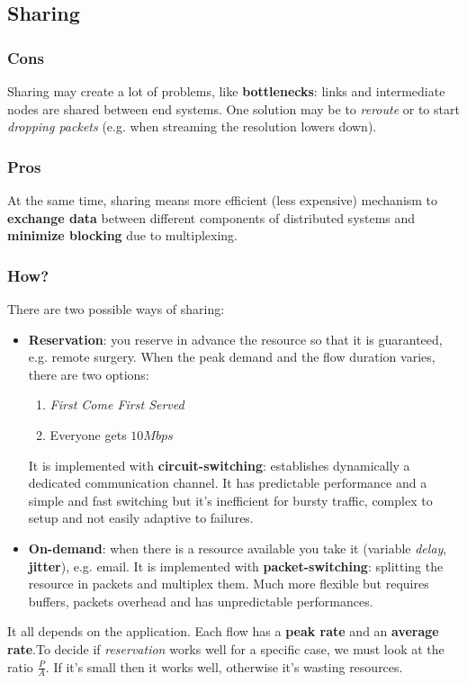\subsection{Sharing}
\subsubsection{Cons}
Sharing may create a lot of problems, like \textbf{bottlenecks}: links and intermediate nodes are shared between end systems. One solution may be to \textit{reroute} or to start \textit{dropping packets} (e.g. when streaming the resolution lowers down).
\subsubsection{Pros}
At the same time, sharing means more efficient (less expensive) mechanism to \textbf{exchange data} between different components of distributed systems and \textbf{minimize blocking} due to multiplexing.

\subsubsection{How?}
There are two possible ways of sharing:
\begin{itemize}
	\item \textbf{Reservation}: you reserve in advance the resource so that it is guaranteed, e.g. remote surgery. When the peak demand and the flow duration varies, there are two options:
	\begin{enumerate}
		\item \textit{First Come First Served}
		\item Everyone gets $10Mbps$
	\end{enumerate}
	It is implemented with \textbf{circuit-switching}: establishes dynamically a dedicated communication channel. It has predictable performance and a simple and fast switching but it's inefficient for bursty traffic, complex to setup and not easily adaptive to failures.
	
	\item \textbf{On-demand}: when there is a resource available you take it (variable \textit{delay}, \textbf{jitter}), e.g. email. It is implemented with \textbf{packet-switching}: splitting the resource in packets and multiplex them. Much more flexible but requires buffers, packets overhead and has unpredictable performances.
\end{itemize}

\begin{observation}
	It all depends on the application. Each flow has a \textbf{peak rate} and an \textbf{average rate}.To decide if \textit{reservation} works well for a specific case, we must look at the ratio $\frac{P}{A}$. If it's small then it works well, otherwise it's wasting resources.
\end{observation}

